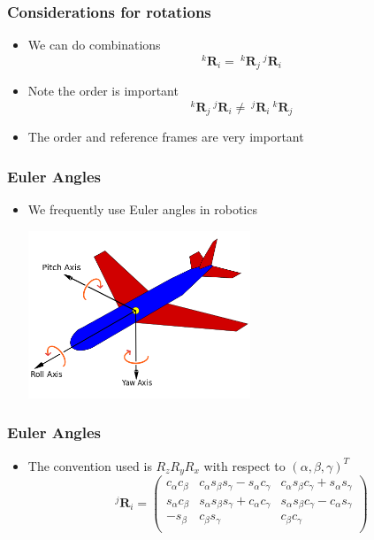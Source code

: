 \documentclass[10pt]{beamer}
\begin{document}
\begin{frame}
  \frametitle{Considerations for rotations}
  \begin{itemize}
  \item We can do combinations
    \[ ~^{k}\mathbf{R}_i = ~^{k}\mathbf{R}_j ~ ^{j}\mathbf{R}_i \]
    \pause
  \item Note the order is important
    \[
     ~^{k}\mathbf{R}_j ~  ^{j}\mathbf{R}_i \neq  ~^{j}\mathbf{R}_i ~ ^{k}\mathbf{R}_j
    \]
  \item The order and reference frames are very important
  \end{itemize}
\end{frame}

\begin{frame}
  \frametitle{Euler Angles}
  \begin{itemize}
  \item We frequently use Euler angles in robotics
    \centerline{\includegraphics[height=5cm]{euler-angles}}
  \end{itemize}
\end{frame}

\begin{frame}
  \frametitle{Euler Angles}
  \begin{itemize}
  \item The convention used is $R_z R_y R_x$ with respect to $(\alpha, \beta, \gamma)^T$
    \[
      ~^{j}\mathbf{R}_i = \left(
        \begin{array}{ccc}
          c_{\alpha} c_{\beta} & c_{\alpha} s_{\beta} s_{\gamma} - s_{\alpha} c_{\gamma} & c_{\alpha} s_{\beta} c_{\gamma} + s_{\alpha} s_{\gamma} \\
          s_{\alpha} c_{\beta} & s_{\alpha} s_{\beta} s_{\gamma} + c_{\alpha} c_{\gamma} & s_{\alpha} s_{\beta} c_{\gamma} - c_{\alpha} s_{\gamma} \\
          - s_{\beta}          & c_{\beta} s_{\gamma}                                    & c_{\beta} c_{\gamma}\\
        \end{array}
      \right)
    \]
  \end{itemize}
\end{frame}
\end{document}
